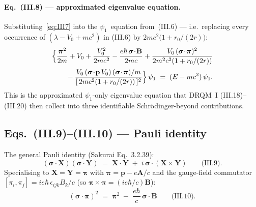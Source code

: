 \paragraph{Eq.~(III.8) --- approximated eigenvalue equation.}
Substituting~\eqref{eq:III7} into the $\psi_1$~equation from~(III.6) ---
i.e.~replacing every occurrence of $(\lambda - V_0 + m c^2)$ in (III.6) by
$2 m c^2\bigl(1 + r_0/(2 r)\bigr)$:
\begin{equation}
\label{eq:III8}
\begin{aligned}
\Bigl\{\frac{\boldsymbol\pi^2}{2m} + V_0 + \frac{V_0^2}{2 m c^2}
 - \frac{e\hbar\,\boldsymbol\sigma\!\cdot\!\mathbf{B}}{2 m c}
 + \frac{V_0\,(\boldsymbol\sigma\!\cdot\!\boldsymbol\pi)^2}{2 m^2 c^2\!\left(1 + r_0/(2r)\right)}
   \\[2pt]
{}- \frac{V_0\,(\boldsymbol\sigma\!\cdot\!\mathbf{p}\,V_0)\,(\boldsymbol\sigma\!\cdot\!\boldsymbol\pi)/m}
       {[\,2 m c^2(1 + r_0/(2r))\,]^2}
\Bigr\}\,\psi_1 \;=\; (E - m c^2)\,\psi_1.
\end{aligned}
\end{equation}
This is the approximated $\psi_1$-only eigenvalue equation that DRQM~I
(III.18)--(III.20) then collect into three identifiable Schr\"odinger-beyond
contributions.

\subsection{Eqs.~(III.9)--(III.10) --- Pauli identity}

The general Pauli identity (Sakurai Eq.~3.2.39):
\begin{equation}
\label{eq:III9-pauli}
(\boldsymbol\sigma\!\cdot\!\mathbf{X})(\boldsymbol\sigma\!\cdot\!\mathbf{Y})
\;=\; \mathbf{X}\!\cdot\!\mathbf{Y}
   \;+\; i\,\boldsymbol\sigma\!\cdot\!(\mathbf{X}\times\mathbf{Y})
\qquad\text{(III.9).}
\end{equation}
Specialising to $\mathbf{X} = \mathbf{Y} = \boldsymbol\pi$ with
$\boldsymbol\pi = \mathbf{p} - e\mathbf{A}/c$ and the gauge-field commutator
$[\pi_i, \pi_j] = i e\hbar\,\epsilon_{ijk} B_k/c$ (so
$\boldsymbol\pi\times\boldsymbol\pi = (i e\hbar/c)\mathbf{B}$):
\begin{equation}
\label{eq:III10-sigmapi-sq}
(\boldsymbol\sigma\!\cdot\!\boldsymbol\pi)^2
\;=\; \boldsymbol\pi^2 \;-\; \frac{e\hbar}{c}\,\boldsymbol\sigma\!\cdot\!\mathbf{B}
\qquad\text{(III.10).}
\end{equation}

